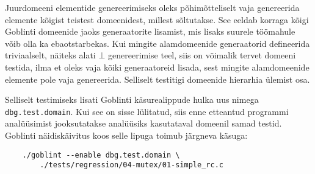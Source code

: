 \documentclass[../thesis.tex]{subfiles}
\begin{document}
Juurdomeeni elementide genereerimiseks oleks põhimõtteliselt vaja genereerida elemente kõigist teistest domeenidest, millest sõltutakse. See eeldab korraga kõigi Goblinti domeenide jaoks generaatorite lisamist, mis lisaks suurele töömahule võib olla ka ebaotstarbekas. Kui mingite alamdomeenide generaatorid defineerida triviaalselt, näiteks alati $\bot$ genereerimise teel, siis on võimalik tervet domeeni testida, ilma et oleks vaja kõiki generaatoreid lisada, sest mingite alamdomeenide elemente pole vaja genereerida. Selliselt testitigi domeenide hierarhia ülemist osa.

Selliselt testimiseks lisati Goblinti käsurealippude hulka uus nimega \texttt{dbg.test.domain}. Kui see on sisse lülitatud, siis enne etteantud programmi analüüsimist jooksutatakse analüüsiks kasutataval domeenil samad testid. Goblinti näidiskäivitus koos selle lipuga toimub järgneva käsuga:
\begin{verbatim}
	./goblint --enable dbg.test.domain \
	    ./tests/regression/04-mutex/01-simple_rc.c
\end{verbatim}

\end{document}
